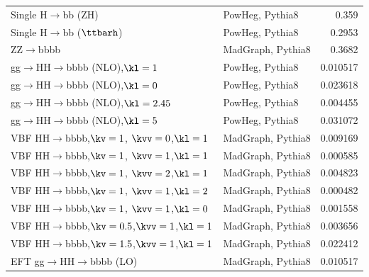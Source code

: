 \begin{table}[htb]
\begin{tabularx}{\textwidth}{lXr}
Single H$\to$bb  ($\mathrm{ZH}$)            & PowHeg, Pythia8    & 0.359   \\ 
Single H$\to$bb  ($\ttbarh$)                & PowHeg, Pythia8    & 0.2953  \\ 
ZZ$\rightarrow$bbbb                         & MadGraph, Pythia8  & 0.3682  \\ 
gg$\to$HH$\to$bbbb (NLO),$\kl=1$            & PowHeg, Pythia8    & 0.010517\\
gg$\to$HH$\to$bbbb (NLO),$\kl=0$            & PowHeg, Pythia8    & 0.023618\\
gg$\to$HH$\to$bbbb (NLO),$\kl=2.45$         & PowHeg, Pythia8    & 0.004455\\
gg$\to$HH$\to$bbbb (NLO),$\kl=5$            & PowHeg, Pythia8    & 0.031072\\
VBF HH$\to$bbbb,$\kv=1$,  $\kvv=0$,$\kl=1$  & MadGraph, Pythia8  & 0.009169\\
VBF HH$\to$bbbb,$\kv=1$,  $\kvv=1$,$\kl=1$  & MadGraph, Pythia8  & 0.000585\\
VBF HH$\to$bbbb,$\kv=1$,  $\kvv=2$,$\kl=1$  & MadGraph, Pythia8  & 0.004823\\
VBF HH$\to$bbbb,$\kv=1$,  $\kvv=1$,$\kl=2$  & MadGraph, Pythia8  & 0.000482\\
VBF HH$\to$bbbb,$\kv=1$,  $\kvv=1$,$\kl=0$  & MadGraph, Pythia8  & 0.001558\\
VBF HH$\to$bbbb,$\kv=0.5$,$\kvv=1$,$\kl=1$  & MadGraph, Pythia8  & 0.003656\\
VBF HH$\to$bbbb,$\kv=1.5$,$\kvv=1$,$\kl=1$  & MadGraph, Pythia8  & 0.022412\\
EFT gg$\to$HH$\to$bbbb (LO)                 & MadGraph, Pythia8  & 0.010517\\
\hline
\end{tabularx}
\end{table}

